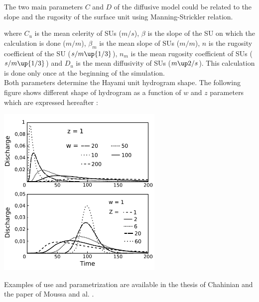 The two main parameters $C$ and $D$ of the diffusive model could be related to the slope and the rugosity of the surface unit using Manning-Strickler relation.



where $C_u$ is the mean celerity of SUs ($m/s$), $\beta$ is the slope of the SU on which the calculation is done ($m/m$), $\beta_m$ is the mean slope of SUs ($m/m$), $n$ is the rugosity coefficient of the SU ($s/m\up{1/3}$), $n_m$ is the mean rugosity coefficient of SUs ($s/m\up{1/3}$) and $D_u$ is the mean diffusivity of SUs ($m\up2/s$). This calculation is done only once at the beginning of the simulation.\\

Both parameters determine the Hayami unit hydrogram shape. The following figure shows different shape of hydrogram as a function of $w$ and $z$ parameters which are expressed hereafter :


\includegraphics[width=8cm]{doc/common/Graphique_noyau_Hayami.pdf}

Examples of use and parametrization are available in the thesis of Chahinian \cite{Chahinian2004} and the paper of Moussa and al. \cite{Moussa2002}.\\
